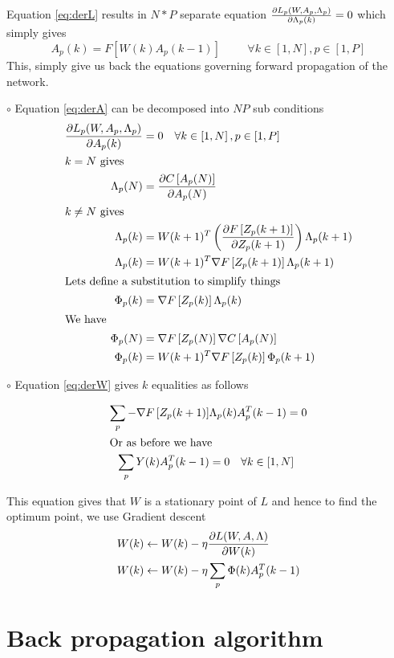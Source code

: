\documentclass[10pt]{article}
\def\pdiff#1#2{ {\partial #1 \over \partial #2}}
\begin{document}
Equation \ref{eq:derL} results in $N\ast{}P$ separate equation $ \pdiff{L_p(W,A_p,\Lambda_p)}{\Lambda_p(k)}=0$ which simply gives 
\begin{equation}
A_p(k) = F\left[W(k) A_p(k-1)\right] \hspace{1cm} \forall k\in\left[1,N\right], p \in \left[1,P\right]
\end{equation}
This, simply give us back  the equations governing forward propagation of the network.

$\circ$ Equation \ref{eq:derA} can be decomposed into $NP$ sub conditions
\begin{align}
	\pdiff{L_p(W,A_p,\Lambda_p)}{A_p(k)}&=0 \hspace{10pt}\forall k\in\left[1,N\right], p\in\left[1,P\right]\\
	\intertext{$k=N$ gives}
	\Lambda_p(N) &= \pdiff{C\left[A_p(N)\right]}{A_p(N)}\\
	\intertext{$k\neq N$ gives}
	\Lambda_p(k) &= W(k+1)^T \left(\pdiff{F\left[Z_p(k+1)\right]}{Z_p(k+1)}\right) \Lambda_p(k+1)\\
	\Lambda_p(k) &= W(k+1)^T \nabla F\left[Z_p(k+1)\right] \Lambda_p(k+1)\\
	\intertext{Lets define a substitution to simplify things}
	\Phi_p(k) &= \nabla F\left[Z_p(k)\right]  \Lambda_p(k)\\
	\intertext{We have}
	\Phi_p(N) &= \nabla F\left[Z_p(N)\right]  \nabla C\left[A_p(N)\right]\\
	\Phi_p(k) &= W(k+1)^T \nabla F\left[Z_p(k)\right]  \Phi_p(k+1) 
\end{align}


$\circ$ Equation \ref{eq:derW} gives $k$ equalities as follows

\begin{align}
\sum_p - \nabla F\left[Z_p(k+1)\right]&\Lambda_p(k)  A_p^T(k-1) = 0\\
\intertext{Or as before we have}
\sum_p Y(k)  A_p^T(k-1) &= 0 \hspace{10pt} \forall k\in\left[1,N\right]
\end{align}

This equation gives that $W$ is a stationary point of $L$ and hence to find the optimum point, we use Gradient descent
\begin{align}
	W(k) &\gets W(k) - \eta\pdiff{L(W,A,\Lambda)}{W(k)}\\
	W(k) &\gets W(k) - \eta \sum_p \Phi(k)  A_p^T(k-1)
\end{align}


\section{Back propagation algorithm}
\end{document}
